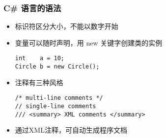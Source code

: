
\begin{frame}[fragile]
\frametitle{C\# 语言的语法}
\begin{itemize}
\item 标识符区分大小，不能以数字开始
  \pause
\item 变量可以随时声明，用 new 关键字创建类的实例
\begin{lstlisting}
int    a = 10;
Circle b = new Circle();
\end{lstlisting}
  \pause
\item 注释有三种风格
\begin{lstlisting}
/* multi-line comments */
// single-line comments
/// <summary> XML comments </summary>
\end{lstlisting}

  \pause

\item  通过XML注释，可自动生成程序文档

\end{itemize}
\end{frame}



